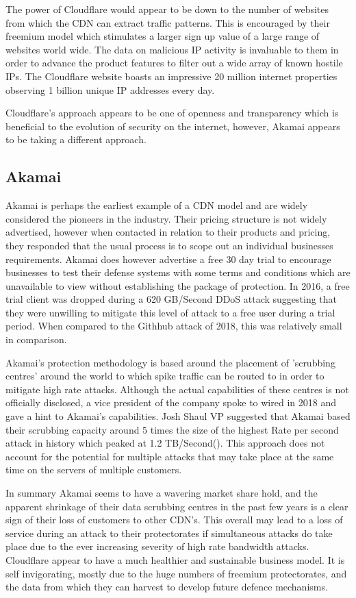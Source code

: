 The power of Cloudflare would appear to be down to the number of websites from which the CDN can extract traffic patterns. This is encouraged by their freemium model which stimulates a larger sign up value of a large range of websites world wide. The data on malicious IP activity is invaluable to them in order to advance the product features to filter out a wide array of known hostile IPs. The Cloudflare website boasts an impressive 20 million internet properties observing 1 billion unique IP addresses every day.

Cloudflare's approach appears to be one of openness and transparency which is beneficial to the evolution of security on the internet, however, Akamai appears to be taking a different approach. 
\subsection{Akamai}
Akamai is perhaps the earliest example of a CDN model and are widely considered the pioneers in the industry. Their pricing structure is not widely advertised, however when contacted in relation to their products and pricing, they responded that the usual process is to scope out an individual businesses requirements.\cite{akamai} Akamai does however advertise a free 30 day trial to encourage businesses to test their defense systems with some terms and conditions which are unavailable to view without establishing the package of protection. In 2016, a free trial client was dropped during a 620 GB/Second DDoS attack suggesting that they were unwilling to mitigate this level of attack to a free user during a trial period. When compared to the Githhub attack of 2018, this was relatively small in comparison.

Akamai's protection methodology is based around the placement of 'scrubbing centres' around the world to which spike traffic can be routed to in order to mitigate high rate attacks. Although the actual capabilities of these centres is not officially disclosed, a vice president of the company spoke to wired in 2018 and gave a hint to Akamai's capabilities. Josh Shaul VP suggested that Akamai based their scrubbing capacity around 5 times the size of the highest Rate per second attack in history which peaked at 1.2 TB/Second(\cite{github}). This approach does not account for the potential for multiple attacks that may take place at the same time on the servers of multiple customers.

In summary Akamai seems to have a wavering market share hold, and the apparent shrinkage of their data scrubbing centres in the past few years is a clear sign of their loss of customers to other CDN's. This overall may lead to a loss of service during an attack to their protectorates if simultaneous attacks do take place due to the ever increasing severity of high rate bandwidth attacks. Cloudflare appear to have a much healthier and sustainable business model. It is self invigorating, mostly due to the huge numbers of freemium protectorates, and the data from which they can harvest to develop future defence mechanisms. 